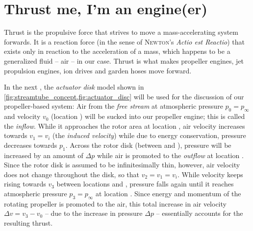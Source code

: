 
\section{Thrust me, I'm an engine(er)}

Thrust %
is the propulsive force that strives to move a mass-accelerating system forwards. 
It is a reaction force (in the sense of \textsc{Newton}'s \textit{Actio est Reactio})
that exists only in reaction to the acceleration of a mass, which happens to be a generalized fluid -- air -- in our case.
Thrust is what makes propeller engines, jet propulsion engines, ion drives and garden 
hoses
move forward.

In the next , 
the \textit{actuator disk} model shown in 
\cref{fig:streamtube_concept,fig:actuator_disc}  
will be used for the discussion of our propeller-based system:
%
Air from the \textit{free stream} at atmospheric pressure $p_0 = p_\infty$ and velocity $v_0$ (location ) will be sucked into our propeller engine; 
this is called the \textit{inflow}. 
While it approaches the rotor area at location , air velocity increases towards $v_1 = v_i$ (the \textit{induced velocity}) while due to energy conservation, pressure decreases towards $p_1$.
Across the rotor disk (between  and ), pressure will be increased by an amount of $\Delta p$ while air is promoted
to the \textit{outflow} at location . 
Since the rotor disk is assumed to be infinitesimally thin, however, air velocity does not change throughout the disk, so that $v_2 = v_1 = v_i$.
While velocity keeps rising towards $v_3$ between locations  and ,
pressure falls again until it reaches atmospheric pressure $p_3 = p_\infty$ at location .
Since energy and momentum of the rotating propeller is promoted to the air, this total increase in air velocity
$\Delta v = v_3 - v_0$ -- due to the increase in pressure $\Delta p$ -- essentially accounts for the resulting thrust.



